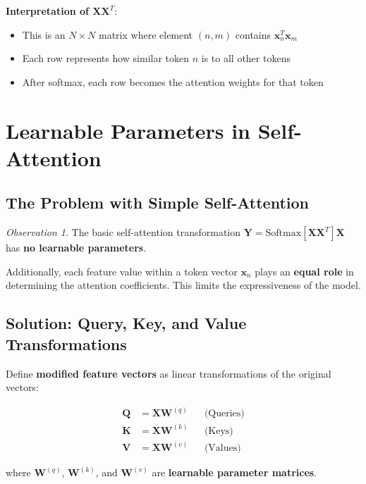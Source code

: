 \documentclass[11pt,a4paper]{article}
\theoremstyle{definition}
\theoremstyle{plain}
\theoremstyle{remark}
\newtheorem*{observation}{Observation}
\begin{document}
\textbf{Interpretation of $\mathbf{X}\mathbf{X}^T$}:
\begin{itemize}
    \item This is an $N \times N$ matrix where element $(n,m)$ contains $\mathbf{x}_n^T \mathbf{x}_m$
    \item Each row represents how similar token $n$ is to all other tokens
    \item After softmax, each row becomes the attention weights for that token
\end{itemize}

\section{Learnable Parameters in Self-Attention}

\subsection{The Problem with Simple Self-Attention}

\begin{observation}
The basic self-attention transformation $\mathbf{Y} = \text{Softmax}[\mathbf{X}\mathbf{X}^T]\mathbf{X}$ has \textbf{no learnable parameters}.

Additionally, each feature value within a token vector $\mathbf{x}_n$ plays an \textbf{equal role} in determining the attention coefficients. This limits the expressiveness of the model.
\end{observation}

\subsection{Solution: Query, Key, and Value Transformations}

\begin{tcolorbox}[colback=green!10!white,colframe=green!75!black,title=\textbf{Modified Feature Vectors}]
Define \textbf{modified feature vectors} as linear transformations of the original vectors:

\begin{align*}
\mathbf{Q} &= \mathbf{X}\mathbf{W}^{(q)} && \text{(Queries)} \\
\mathbf{K} &= \mathbf{X}\mathbf{W}^{(k)} && \text{(Keys)} \\
\mathbf{V} &= \mathbf{X}\mathbf{W}^{(v)} && \text{(Values)}
\end{align*}

where $\mathbf{W}^{(q)}$, $\mathbf{W}^{(k)}$, and $\mathbf{W}^{(v)}$ are \textbf{learnable parameter matrices}.
\end{tcolorbox}
\end{document}
